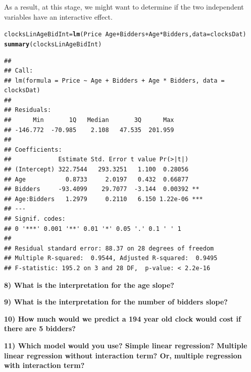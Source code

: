 \documentclass{article}\usepackage[]{graphicx}\usepackage[]{color}
\makeatletter
\newcommand{\hlopt}[1]{\textcolor[rgb]{0,0,0}{#1}}%
\newcommand{\hlstd}[1]{\textcolor[rgb]{0.345,0.345,0.345}{#1}}%
\newcommand{\hlkwb}[1]{\textcolor[rgb]{0.69,0.353,0.396}{#1}}%
\newcommand{\hlkwc}[1]{\textcolor[rgb]{0.333,0.667,0.333}{#1}}%
\newcommand{\hlkwd}[1]{\textcolor[rgb]{0.737,0.353,0.396}{\textbf{#1}}}%
\newenvironment{kframe}{%
 \def\at@end@of@kframe{}%
 \ifinner\ifhmode%
  \def\at@end@of@kframe{\end{minipage}}%
  \begin{minipage}{\columnwidth}%
 \fi\fi%
 \def\FrameCommand##1{\hskip\@totalleftmargin \hskip-\fboxsep
 \colorbox{shadecolor}{##1}\hskip-\fboxsep
     \hskip-\linewidth \hskip-\@totalleftmargin \hskip\columnwidth}%
 \MakeFramed {\advance\hsize-\width
   \@totalleftmargin\z@ \linewidth\hsize
   \@setminipage}}%
 {\par\unskip\endMakeFramed%
 \at@end@of@kframe}
\newenvironment{knitrout}{}{} %
\makeatother
\begin{document}
\vspace{5mm}

\noindent As a result, at this stage, we might want to determine if the two independent variables have an interactive effect.

\begin{knitrout}
\color{fgcolor}\begin{kframe}
\begin{alltt}
\hlstd{clocksLinAgeBidInt} \hlkwb{=} \hlkwd{lm}\hlstd{(Price} \hlopt{~} \hlstd{Age} \hlopt{+} \hlstd{Bidders} \hlopt{+} \hlstd{Age}\hlopt{*}\hlstd{Bidders,} \hlkwc{data}\hlstd{=clocksDat)}
\hlkwd{summary}\hlstd{(clocksLinAgeBidInt)}
\end{alltt}
\begin{verbatim}
## 
## Call:
## lm(formula = Price ~ Age + Bidders + Age * Bidders, data = clocksDat)
## 
## Residuals:
##      Min       1Q   Median       3Q      Max 
## -146.772  -70.985    2.108   47.535  201.959 
## 
## Coefficients:
##             Estimate Std. Error t value Pr(>|t|)    
## (Intercept) 322.7544   293.3251   1.100  0.28056    
## Age           0.8733     2.0197   0.432  0.66877    
## Bidders     -93.4099    29.7077  -3.144  0.00392 ** 
## Age:Bidders   1.2979     0.2110   6.150 1.22e-06 ***
## ---
## Signif. codes:  
## 0 '***' 0.001 '**' 0.01 '*' 0.05 '.' 0.1 ' ' 1
## 
## Residual standard error: 88.37 on 28 degrees of freedom
## Multiple R-squared:  0.9544,	Adjusted R-squared:  0.9495 
## F-statistic: 195.2 on 3 and 28 DF,  p-value: < 2.2e-16
\end{verbatim}
\end{kframe}
\end{knitrout}

\vspace{5mm}

\textbf{8) What is the interpretation for the age slope?}

\vspace{20mm}

\textbf{9) What is the interpretation for the number of bidders slope?}

\vspace{20mm}

\textbf{10) How much would we predict a 194 year old clock would cost if there are 5 bidders?}

\vspace{20mm}

\textbf{11) Which model would you use? Simple linear regression? Multiple linear regression without interaction term? Or, multiple regression with interaction term?}
\end{document}
